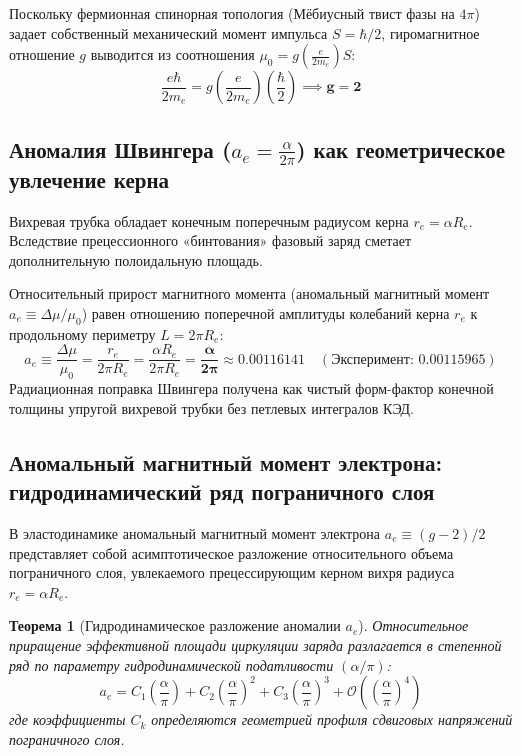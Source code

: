 \documentclass[12pt,a4paper]{article}
\newtheorem{theorem}{Теорема}
\begin{document}
	Поскольку фермионная спинорная топология (Мёбиусный твист фазы на $4\pi$) задает собственный механический момент импульса $S = \hbar/2$, гиромагнитное отношение $g$ выводится из соотношения $\mu_0 = g \left( \frac{e}{2 m_e} \right) S$:
	\begin{equation}
		\frac{e \hbar}{2 m_e} = g \left( \frac{e}{2 m_e} \right) \left( \frac{\hbar}{2} \right) \implies \mathbf{g = 2}
	\end{equation}
	
	\subsection{Аномалия Швингера ($a_e = \frac{\alpha}{2\pi}$) как геометрическое увлечение керна}
	Вихревая трубка обладает конечным поперечным радиусом керна $r_e = \alpha R_e$. Вследствие прецессионного «бинтования» фазовый заряд сметает дополнительную полоидальную площадь.
	
	Относительный прирост магнитного момента (аномальный магнитный момент $a_e \equiv \Delta \mu / \mu_0$) равен отношению поперечной амплитуды колебаний керна $r_e$ к продольному периметру $L = 2\pi R_e$:
	\begin{equation}
		a_e \equiv \frac{\Delta \mu}{\mu_0} = \frac{r_e}{2\pi R_e} = \frac{\alpha R_e}{2\pi R_e} = \mathbf{\frac{\alpha}{2\pi}} \approx \mathbf{0.00116141} \quad (\text{Эксперимент: } 0.00115965)
	\end{equation}
	Радиационная поправка Швингера получена как чистый форм-фактор конечной толщины упругой вихревой трубки без петлевых интегралов КЭД.
	
	\subsection{Аномальный магнитный момент электрона: гидродинамический ряд пограничного слоя}
	
	В эластодинамике аномальный магнитный момент электрона $a_e \equiv (g-2)/2$ представляет собой асимптотическое разложение относительного объема пограничного слоя, увлекаемого прецессирующим керном вихря радиуса $r_e = \alpha R_e$.
	
	\begin{theorem}[Гидродинамическое разложение аномалии $a_e$]
		Относительное приращение эффективной площади циркуляции заряда разлагается в степенной ряд по параметру гидродинамической податливости $(\alpha/\pi)$:
		\begin{equation}
			a_e = C_1 \left(\frac{\alpha}{\pi}\right) + C_2 \left(\frac{\alpha}{\pi}\right)^2 + C_3 \left(\frac{\alpha}{\pi}\right)^3 + \mathcal{O}\left( \left(\frac{\alpha}{\pi}\right)^4 \right)
		\end{equation}
		где коэффициенты $C_k$ определяются геометрией профиля сдвиговых напряжений пограничного слоя.
	\end{theorem}
	
\end{document}
